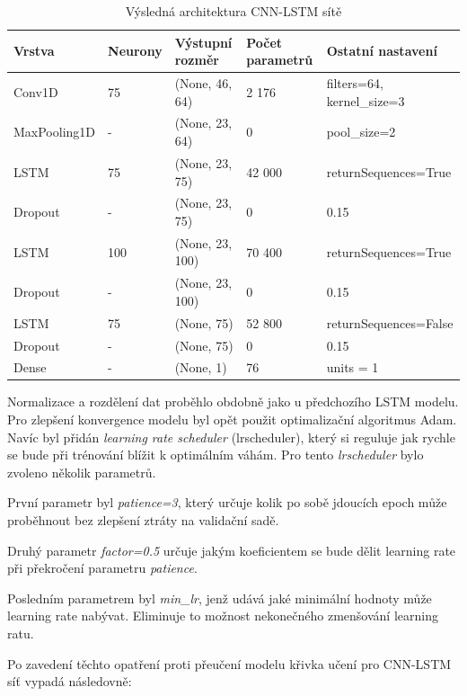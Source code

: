 \documentclass[FM,BP,fonts]{tulthesis}
\begin{document}
\begin{table}[!ht]
	\centering
	\caption{Výsledná architektura CNN-LSTM sítě}
	
	\begin{tabularx}{\linewidth}{llXXX}
		\hline
		\textbf{Vrstva} & \textbf{Neurony} & \textbf{Výstupní rozměr} & \textbf{Počet parametrů} & \textbf{Ostatní nastavení} \\ \hline
			Conv1D & 75 &  (None, 46, 64)   & 2 176 & filters=64, kernel\_size=3 \\
			MaxPooling1D & - &  (None, 23, 64)   & 0 & pool\_size=2 \\
			LSTM & 75 & (None, 23, 75) &  42 000 & returnSequences=True \\
			Dropout & - & (None, 23, 75) & 0 & 0.15 \\
			LSTM  & 100 & (None, 23, 100) & 70 400 & returnSequences=True \\
			Dropout & - & (None, 23, 100) & 0 & 0.15 \\
			LSTM   & 75 & (None, 75) & 52 800 & returnSequences=False \\
			Dropout & - & (None, 75) & 0 & 0.15 \\
			Dense & - & (None, 1) & 76 & units = 1 \\
	\end{tabularx}
\end{table}

Normalizace a rozdělení dat proběhlo obdobně jako u předchozího LSTM modelu. Pro zlepšení konvergence modelu byl opět použit optimalizační algoritmus Adam. Navíc byl přidán \textit{learning rate scheduler} (lrscheduler), který si reguluje jak rychle se bude při trénování blížit k optimálním váhám. Pro tento \textit{lrscheduler} bylo zvoleno několik parametrů. 

První parametr byl \textit{patience=3}, který určuje kolik po sobě jdoucích epoch může proběhnout bez zlepšení ztráty na validační sadě. 

Druhý parametr \textit{factor=0.5} určuje jakým koeficientem se bude dělit learning rate při překročení parametru \textit{patience}. 

Posledním parametrem byl \textit{min\_lr}, jenž udává jaké minimální hodnoty může learning rate nabývat. Eliminuje to možnost nekonečného zmenšování learning ratu.

Po zavedení těchto opatření proti přeučení modelu křivka učení pro CNN-LSTM síť vypadá následovně:
\end{document}
